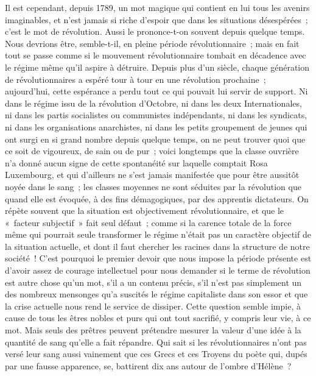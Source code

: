 \documentclass[french,twoside]{book} %
\begin{document}
Il est cependant, depuis 1789, un mot magique qui contient en lui tous les avenirs imaginables, et n'est jamais si riche d'espoir que dans les situations désespérées ; c'est le mot de révolution. Aussi le prononce-t-on souvent depuis quelque temps. Nous devrions être, semble-t-il, en pleine période révolutionnaire ; mais en fait tout se passe comme si le mouvement révolutionnaire tombait en décadence avec le régime même qu'il aspire à détruire. Depuis plus d'un siècle, chaque génération de révolutionnaires a espéré tour à tour en une révolution prochaine ; aujourd'hui, cette espérance a perdu tout ce qui pouvait lui servir de support. Ni dans le régime issu de la révolution d'Octobre, ni dans les deux Internationales, ni dans les partis socialistes ou communistes indépendants, ni dans les syndicats, ni dans les organisations anarchistes, ni dans les petits groupement de jeunes qui ont surgi en si grand nombre depuis quelque temps, on ne peut trouver quoi que ce soit de vigoureux, de sain ou de pur ; voici longtemps que la classe ouvrière n'a donné aucun signe de cette spontanéité sur laquelle comptait Rosa Luxembourg, et qui d'ailleurs ne s'est jamais manifestée que pour être aussitôt noyée dans le sang ; les classes moyennes ne sont séduites par la révolution que quand elle est évoquée, à des fins démagogiques, par des apprentis dictateurs. On répète souvent que la situation est objectivement révolutionnaire, et que le « facteur subjectif » fait seul défaut ; comme si la carence totale de la force même qui pourrait seule transformer le régime n'était pas un caractère objectif de la situation actuelle, et dont il faut chercher les racines dans la structure de notre société ! C'est pourquoi le premier devoir que nous impose la période présente est d'avoir assez de courage intellectuel pour nous demander si le terme de révolution est autre chose qu'un mot, s'il a un contenu précis, s'il n'est pas simplement un des nombreux mensonges qu'a suscités le régime capitaliste dans son essor et que la crise actuelle nous rend le service de dissiper. Cette question semble impie, à cause de tous les êtres nobles et purs qui ont tout sacrifié, y compris leur vie, à ce mot. Mais seuls des prêtres peuvent prétendre mesurer la valeur d'une idée à la quantité de sang qu'elle a fait répandre. Qui sait si les révolutionnaires n'ont pas versé leur sang aussi vainement que ces Grecs et ces Troyens du poète qui, dupés par une fausse apparence, se, battirent dix ans autour de l'ombre d'Hélène ?\par
\end{document}
